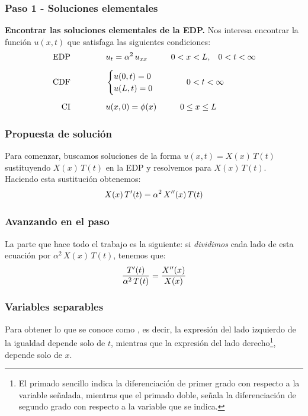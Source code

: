 \documentclass[12pt]{beamer}
\begin{document}
\begin{frame}
\frametitle{Paso 1 - Soluciones elementales}
\textbf{Encontrar las soluciones elementales de la EDP.}
\pause
Nos interesa encontrar la función $u (x, t)$ que satisfaga las siguientes condiciones:
\pause
\begin{align*}
\mbox{EDP} \hspace{1.5cm} &u_{t} = \alpha^{2} \, u_{xx} \hspace{1cm} 0 < x < L, \hspace{0.3cm} 0 < t < \infty \\[0.5em] 
\mbox{CDF} \hspace{1.5cm} &\begin{cases}
    u (0, t) = 0 \\
    u (L, t) = 0
    \end{cases}
    \hspace{1cm}
    0 < t < \infty \\[0.5em]
\mbox{CI} \hspace{1.5cm} & u (x, 0) = \phi (x) \hspace{1cm} 0 \leq x \leq L
\end{align*}
\end{frame}
\begin{frame}
\frametitle{Propuesta de solución}
Para comenzar, buscamos soluciones de la forma $u (x, t) = X(x) \, T (t)$ sustituyendo $X (x) \, T (t)$ en la EDP y resolvemos para  $X (x) \, T (t)$.
\\
\bigskip
\pause
Haciendo esta sustitución obtenemos:
\pause
\begin{align*}
X (x) \, {T}^{\prime} (t) = \alpha^{2} \, {X}^{\prime \prime} (x) \, T (t)
\end{align*}
\end{frame}
\begin{frame}
\frametitle{Avanzando en el paso}
La parte que hace todo el trabajo es la siguiente: si \emph{dividimos} cada lado de esta ecuación por $\alpha^{2} \, X (x) \, T (t)$, tenemos que:
\pause
\begin{align*}
\dfrac{{T}^{\prime} (t)}{\alpha^{2} \, T (t)} = \dfrac{{X}^{\prime \prime} (x)}{X (x)}
\end{align*}
\end{frame}
\begin{frame}
\frametitle{Variables separables}
Para obtener lo que se conoce como , es decir, la expresión del lado izquierdo de la igualdad depende solo de $t$, mientras que la expresión del lado derecho\footnote{El primado sencillo indica la diferenciación de primer grado con respecto a la variable señalada, mientras que el primado doble, señala la diferenciación de segundo grado con respecto a la variable que se indica.}, depende solo de $x$.
\end{frame}
\end{document}
